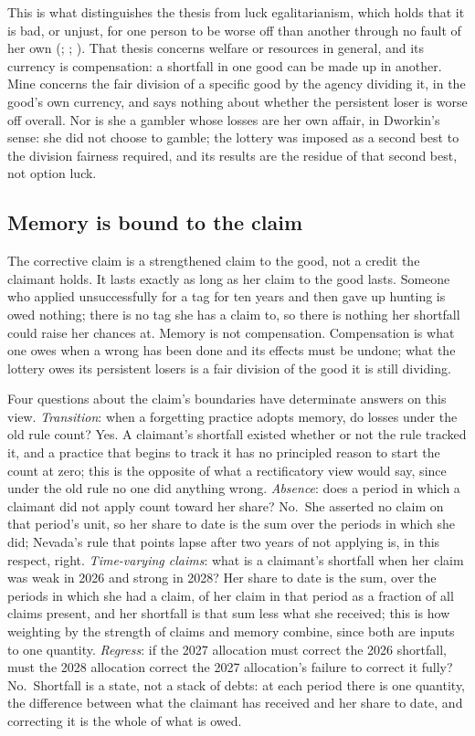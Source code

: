 \documentclass[
  11pt,
  letterpaper,
  DIV=11,
  numbers=noendperiod,
  twoside]{scrartcl}
\begin{document}
This is what distinguishes the thesis from luck egalitarianism, which
holds that it is bad, or unjust, for one person to be worse off than
another through no fault of her own (; ;
). That thesis concerns welfare or
resources in general, and its currency is compensation: a shortfall in
one good can be made up in another. Mine concerns the fair division of a
specific good by the agency dividing it, in the good's own currency, and
says nothing about whether the persistent loser is worse off overall.
Nor is she a gambler whose losses are her own affair, in Dworkin's
sense: she did not choose to gamble; the lottery was imposed as a second
best to the division fairness required, and its results are the residue
of that second best, not option luck.

\subsection{Memory is bound to the
claim}\label{memory-is-bound-to-the-claim}

The corrective claim is a strengthened claim to the good, not a credit
the claimant holds. It lasts exactly as long as her claim to the good
lasts. Someone who applied unsuccessfully for a tag for ten years and
then gave up hunting is owed nothing; there is no tag she has a claim
to, so there is nothing her shortfall could raise her chances at. Memory
is not compensation. Compensation is what one owes when a wrong has been
done and its effects must be undone; what the lottery owes its
persistent losers is a fair division of the good it is still dividing.

Four questions about the claim's boundaries have determinate answers on
this view. \emph{Transition}: when a forgetting practice adopts memory,
do losses under the old rule count? Yes. A claimant's shortfall existed
whether or not the rule tracked it, and a practice that begins to track
it has no principled reason to start the count at zero; this is the
opposite of what a rectificatory view would say, since under the old
rule no one did anything wrong. \emph{Absence}: does a period in which a
claimant did not apply count toward her share? No.~She asserted no claim
on that period's unit, so her share to date is the sum over the periods
in which she did; Nevada's rule that points lapse after two years of not
applying is, in this respect, right. \emph{Time-varying claims}: what is
a claimant's shortfall when her claim was weak in 2026 and strong in
2028? Her share to date is the sum, over the periods in which she had a
claim, of her claim in that period as a fraction of all claims present,
and her shortfall is that sum less what she received; this is how
weighting by the strength of claims and memory combine, since both are
inputs to one quantity. \emph{Regress}: if the 2027 allocation must
correct the 2026 shortfall, must the 2028 allocation correct the 2027
allocation's failure to correct it fully? No.~Shortfall is a state, not
a stack of debts: at each period there is one quantity, the difference
between what the claimant has received and her share to date, and
correcting it is the whole of what is owed.
\end{document}
